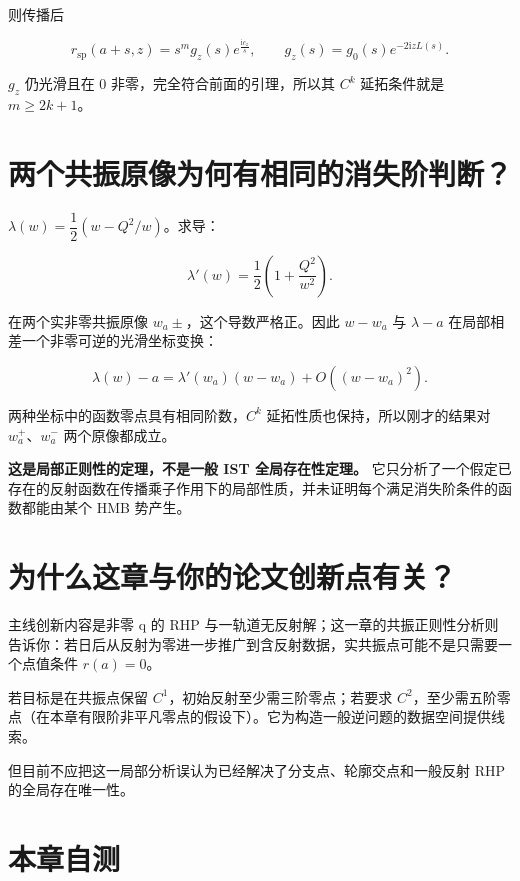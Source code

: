 则传播后\par

\[
r_{\mathrm{sp}}(a+s,z)
=s^m g_z(s)e^{\frac{\mathrm{i}c_z}{s}},
\qquad
g_z(s)=g_0(s)e^{-2\mathrm{i}zL(s)}.
\]

$g_z$ 仍光滑且在 0 非零，完全符合前面的引理，所以其 $C^k$ 延拓条件就是 $m\ge{}2k+1$。\par

\section{两个共振原像为何有相同的消失阶判断？}

$\lambda{}(w)=\dfrac{1}{2}(w-Q^{2}/w)$。求导：\par

\[
\lambda'(w)
=\dfrac{1}{2}\left(1+\dfrac{Q^2}{w^2}\right).
\]

在两个实非零共振原像 $w_{a}\pm{}$，这个导数严格正。因此 $w-w_{a}$ 与 $\lambda{}-a$ 在局部相差一个非零可逆的光滑坐标变换：\par

\[
\lambda(w)-a
=\lambda'(w_a)(w-w_a)+O((w-w_a)^2).
\]

两种坐标中的函数零点具有相同阶数，$C^k$ 延拓性质也保持，所以刚才的结果对 $w_{a}^{+}$、$w_{a}^{-}$ 两个原像都成立。\par

\textbf{这是局部正则性的定理，不是一般 IST 全局存在性定理。} 它只分析了一个假定已存在的反射函数在传播乘子作用下的局部性质，并未证明每个满足消失阶条件的函数都能由某个 HMB 势产生。\par

\section{为什么这章与你的论文创新点有关？}

主线创新内容是非零 q 的 RHP 与一轨道无反射解；这一章的共振正则性分析则告诉你：若日后从反射为零进一步推广到含反射数据，实共振点可能不是只需要一个点值条件 $r(a)=0$。\par

若目标是在共振点保留 $C^{1}$，初始反射至少需三阶零点；若要求 $C^{2}$，至少需五阶零点（在本章有限阶非平凡零点的假设下）。它为构造一般逆问题的数据空间提供线索。\par

但目前不应把这一局部分析误认为已经解决了分支点、轮廓交点和一般反射 RHP 的全局存在唯一性。\par

\section{本章自测}

